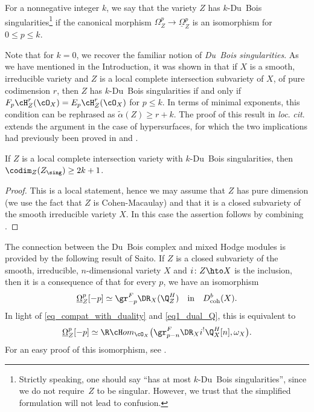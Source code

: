 \begin{defi}\label{defi_k_DuBois}
For a nonnegative integer $k$, we say that the variety $Z$ has $k$\nobreakdash-Du~Bois singularities\footnote{Strictly speaking, one should say ``has at most $k$-Du~Bois singularities'', since we do not require~$Z$ to be singular. However,
we trust that the simplified formulation will not lead to confusion.} if the canonical morphism $\Omega_Z^p\to \underline{\Omega}_Z^p$ is an isomorphism for $0\leq p\leq k$.
\end{defi}

Note that for $k=0$, we recover the familiar notion of \emph{Du~Bois singularities}.
As we have mentioned in the Introduction, it was shown in \cite[Th.\,F]{MP1} that if $X$ is a smooth, irreducible variety and $Z$ is a local complete intersection
subvariety of $X$, of pure codimension $r$, then $Z$ has $k$-Du~Bois singularities if and only if $F_p\cH^r_Z(\cO_X)=E_p\cH^r_Z(\cO_X)$ for $p\leq k$. In terms of minimal exponents,
this condition can be rephrased as $\widetilde{\alpha}(Z)\geq r+k$. The proof of this result in \emph{loc}. \emph{cit}. extends the argument in the case of hypersurfaces,
for which the two implications had previously been proved in
\cite{MOPW} and \cite{Saito_et_al}.

\begin{prop}\label{sing_locus_Du_Bois}
If $Z$ is a local complete intersection variety with $k$-Du~Bois singularities, then
$\codim_Z(Z_\sing)\geq 2k+1$.
\end{prop}

\begin{proof}
This is a local statement, hence we may assume that $Z$ has pure dimension (we use the fact that
$Z$ is Cohen-Macaulay) and that it is a closed subvariety of the smooth irreducible variety $X$. In this case the assertion follows by combining
\cite[Cor.\,3.40 and Th.\,F]{MP1}.
\end{proof}

The connection between the Du~Bois complex and mixed Hodge modules is provided by the following result of Saito. If $Z$ is a closed subvariety
of the smooth, irreducible, $n$-dimensional variety $X$ and $i\colon Z\hto X$ is the inclusion, then it is a consequence of
\cite[Th.\,4.2]{Saito-HC} that for every $p$, we have an isomorphism
\begin{equation}\label{eq_Saito_DuBois}
\underline{\Omega}_Z^p[-p]\simeq \gr^F_{-p}\DR_X(\Q_Z^H)\quad\text{in}\quad D^b_\mathrm{coh}(X).
\end{equation}
In light of \eqref{eq_compat_with_duality} and \eqref{eq1_dual_Q}, this is equivalent to
\begin{equation}\label{eq2_Saito_DuBois}
\underline{\Omega}_Z^p[-p]\simeq \R\cH om_{\cO_X}\big(\gr^F_{p-n}\DR_Xi^!\Q_X^H[n],\omega_X\big).
\end{equation}
For an easy proof of this isomorphism, see \cite[Prop.\,5.5]{MP1}.


